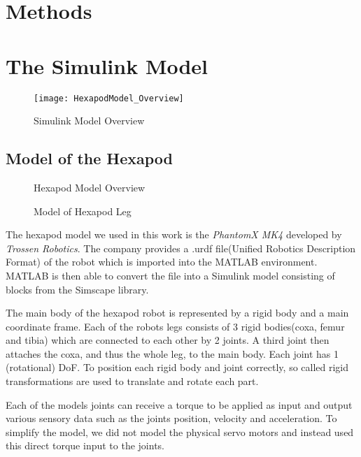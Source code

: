 \graphicspath{ {./images} }

\chapter{Methods}
\label{ch:methods}

\chapter{The Simulink Model}
\begin{figure}
	\centerline{\texttt{[image: HexapodModel\_Overview]}}
	\caption{Simulink Model Overview}
	\label{Simulink Model Overview}
\end{figure}

\section{Model of the Hexapod}

\begin{figure}
	\centerline{}
	\caption{Hexapod Model Overview}
	\label{Hexapod Model Overview}
\end{figure}

\begin{figure}
	\centerline{}
	\caption{Model of Hexapod Leg}
	\label{Hexapod Leg}
\end{figure}


The hexapod model we used in this work is the \textit{PhantomX MK4} developed by \textit{Trossen Robotics}.
The company provides a .urdf file(Unified Robotics Description Format) of the robot which is imported into the MATLAB environment.
MATLAB is then able to convert the file into a Simulink model consisting of blocks from the Simscape library.

The main body of the hexapod robot is represented by a rigid body and a main coordinate frame.
Each of the robots legs consists of 3 rigid bodies(coxa, femur and tibia) which are connected to each other by 2 joints.
A third joint then attaches the coxa, and thus the whole leg, to the main body.
Each joint has 1 (rotational) DoF.
To position each rigid body and joint correctly, so called rigid transformations are used to translate and rotate each part.

Each of the models joints can receive a torque to be applied as input and output various sensory data such as the joints position, velocity and acceleration. 
To simplify the model, we did not model the physical servo motors and instead used this direct torque input to the joints.

